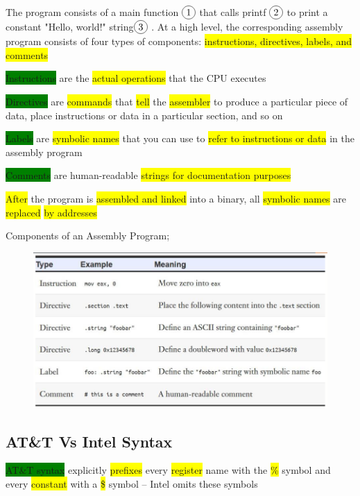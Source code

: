 \documentclass[]{project_plan}
\newcommand*\circled[1]{\tikz[baseline=(char.base)]{
            \node[shape=circle,draw,inner sep=2pt] (char) {#1};}}
\begin{document}
The program consists of a main function $\circled{1}$ that calls printf
$\circled{2}$ to print a constant "Hello, world!" string$\circled{3}$ . At a high
level, the corresponding assembly program consists of four
types of components: \colorbox{yellow}{instructions, directives, labels, and comments}

\colorbox{green}{Instructions} are the \colorbox{yellow}{actual operations} that the CPU executes

\colorbox{green}{Directives} are \colorbox{yellow}{commands} that \colorbox{yellow}{tell} the \colorbox{yellow}{assembler} to produce a particular piece
of data, place instructions or data in a particular section, and so on

\colorbox{green}{Labels} are \colorbox{yellow}{symbolic names} that you can use to \colorbox{yellow}{refer to instructions or data}
in the assembly program

\colorbox{green}{Comments} are human-readable \colorbox{yellow}{strings for documentation purposes}

\colorbox{yellow}{After} the program is \colorbox{yellow}{assembled and linked} into a binary, all \colorbox{yellow}{symbolic names}
are \colorbox{yellow}{replaced} \colorbox{yellow}{by addresses}

Components of an Assembly Program;
\begin{figure}[H]
  \centering
  \includegraphics[width=.8\linewidth]{assembly_program_components.png}
\end{figure}

\subsection{AT\&T Vs Intel Syntax}

\colorbox{green}{AT\&T syntax} explicitly \colorbox{yellow}{prefixes} every \colorbox{yellow}{register} name with the \colorbox{yellow}{\%} symbol and every \colorbox{yellow}{constant}
with a \colorbox{yellow}{\$} symbol – Intel omits these symbols
\end{document}
